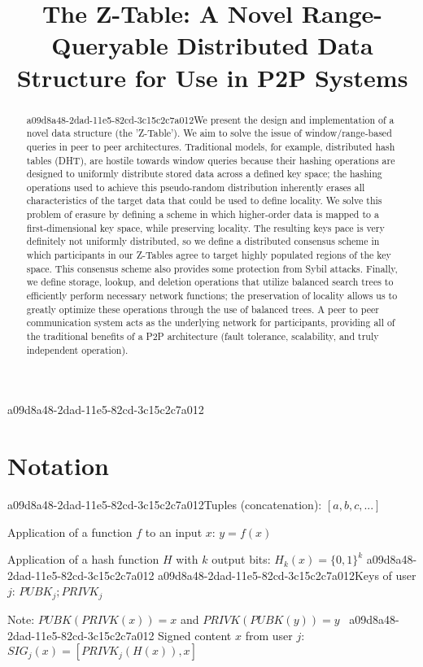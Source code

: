 \documentclass[12pt]{article}
\title{The Z-Table: A Novel Range-Queryable Distributed Data Structure for Use in P2P Systems}
\begin{document}
\maketitle

\begin{abstract}
a09d8a48-2dad-11e5-82cd-3c15c2c7a012We present the design and implementation of a novel data structure (the 'Z-Table'). We aim to solve the issue of window/range-based queries in peer to peer architectures. Traditional models, for example,  distributed hash tables (DHT), are hostile towards window queries because their hashing operations are designed to uniformly distribute stored data across a defined key space; the hashing operations used to achieve this pseudo-random distribution inherently erases all characteristics of the target data that could be used to define locality. We solve this problem of erasure by defining a scheme in which higher-order data is mapped to a first-dimensional key space, while preserving locality. The resulting keys pace is very definitely not uniformly distributed, so we define a distributed consensus scheme in which participants in our Z-Tables agree to target highly populated regions of the key space. This consensus scheme also provides some protection from Sybil attacks. Finally, we define storage, lookup, and deletion operations that utilize balanced search trees to efficiently perform necessary network functions; the preservation of locality allows us to greatly optimize these operations through the use of balanced trees. A peer to peer communication system acts as the underlying network for participants, providing all of the traditional benefits of a P2P architecture (fault tolerance, scalability, and truly independent operation).
\end{abstract}
a09d8a48-2dad-11e5-82cd-3c15c2c7a012
\section{Notation}

a09d8a48-2dad-11e5-82cd-3c15c2c7a012Tuples (concatenation): $[a,b,c,...]$

Application of a function $f$ to an input $x$: $y=f(x)$

Application of a hash function $H$ with $k$ output bits: $H_{k}(x) = \{0,1\}^k$
a09d8a48-2dad-11e5-82cd-3c15c2c7a012
a09d8a48-2dad-11e5-82cd-3c15c2c7a012Keys of user $j$: $ PUBK_j; PRIVK_j $

Note: $PUBK(PRIVK(x)) = x$ and $PRIVK(PUBK(y)) = y$~
a09d8a48-2dad-11e5-82cd-3c15c2c7a012
Signed content $x$ from user $j$: $SIG_j(x) = \left[ PRIVK_j( H(x) ), x \right]$
\end{document}

